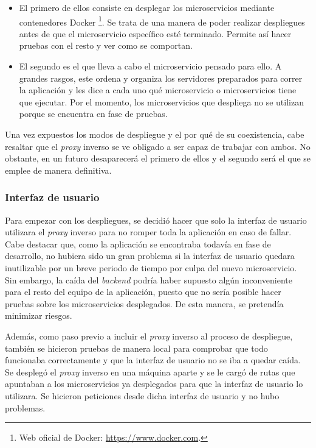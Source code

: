 \documentclass[11pt,spanish,listoffigures]{tfgetsinf}
\begin{document}
\begin{itemize}

	\item El primero de ellos consiste en desplegar los microservicios mediante contenedores Docker \footnote{Web oficial de Docker: \url{https://www.docker.com}.}. Se trata de una manera de poder realizar despliegues antes de que el microservicio específico esté terminado. Permite así hacer pruebas con el resto y ver como se comportan.

	\item El segundo es el que lleva a cabo el microservicio pensado para ello. A grandes rasgos, este ordena y organiza los servidores preparados para correr la aplicación y les dice a cada uno qué microservicio o microservicios tiene que ejecutar. Por el momento, los microservicios que despliega no se utilizan porque se encuentra en fase de pruebas.

\end{itemize}

Una vez expuestos los modos de despliegue y el por qué de su coexistencia, cabe resaltar que el \emph{proxy} inverso se ve obligado a ser capaz de trabajar con ambos. No obstante, en un futuro desaparecerá el primero de ellos y el segundo será el que se emplee de manera definitiva.


			\subsubsection{Interfaz de usuario}

Para empezar con los despliegues, se decidió hacer que solo la interfaz de usuario utilizara el \emph{proxy} inverso para no romper toda la aplicación en caso de fallar. Cabe destacar que, como la aplicación se encontraba todavía en fase de desarrollo, no hubiera sido un gran problema si la interfaz de usuario quedara inutilizable por un breve periodo de tiempo por culpa del nuevo microservicio. Sin embargo, la caída del \emph{backend} podría haber supuesto algún inconveniente para el resto del equipo de la aplicación, puesto que no sería posible hacer pruebas sobre los microservicios desplegados. De esta manera, se pretendía minimizar riesgos.

Además, como paso previo a incluir el \emph{proxy} inverso al proceso de despliegue, también se hicieron pruebas de manera local para comprobar que todo funcionaba correctamente y que la interfaz de usuario no se iba a quedar caída. Se desplegó el \emph{proxy} inverso en una máquina aparte y se le cargó de rutas que apuntaban a los microservicios ya desplegados para que la interfaz de usuario lo utilizara. Se hicieron peticiones desde dicha interfaz de usuario y no hubo problemas.
\end{document}
